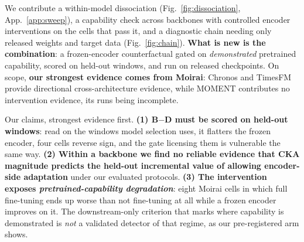 \documentclass{article}
\begin{document}
\vspace{-1.5mm}
\begin{center}
\end{center}
\vspace{-1.5mm}

We contribute a within-model dissociation (Fig.~\ref{fig:dissociation}, App.~\ref{app:sweep}), a capability check across backbones with controlled encoder interventions on the cells that pass it, and a diagnostic chain needing only released weights and target data (Fig.~\ref{fig:chain}). \textbf{What is new is the combination}: a frozen-encoder counterfactual gated on \emph{demonstrated} pretrained capability, scored on held-out windows, and run on released checkpoints. On scope, \textbf{our strongest evidence comes from Moirai}: Chronos and TimesFM provide directional cross-architecture evidence, while MOMENT contributes no intervention evidence, its runs being incomplete.

Our claims, strongest evidence first. \textbf{(1) B$-$D must be scored on held-out windows}: read on the windows model selection uses, it flatters the frozen encoder, four cells reverse sign, and the gate licensing them is vulnerable the same way. \textbf{(2) Within a backbone we find no reliable evidence that CKA magnitude predicts the held-out incremental value of allowing encoder-side adaptation} under our evaluated protocols. \textbf{(3) The intervention exposes \emph{pretrained-capability degradation}}: eight Moirai cells in which full fine-tuning ends up worse than not fine-tuning at all while a frozen encoder improves on it. The downstream-only criterion that marks where capability is demonstrated is \emph{not} a validated detector of that regime, as our pre-registered arm shows.
\end{document}
